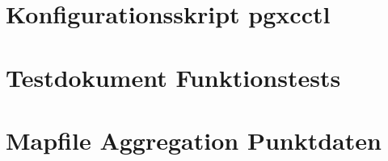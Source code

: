 \section{Konfigurationsskript pgxcctl}

\section{Testdokument Funktionstests}

\section{Mapfile Aggregation Punktdaten}

												

\pagestyle{empty}


